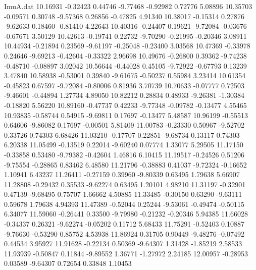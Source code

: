 \begin{filecontents}{ImuA.dat}
  10.16931   -0.32423    0.44746   -9.77468   -0.92982    0.72776    5.08896
  10.35703   -0.09571    0.30748   -9.57368    0.26856   -0.47825    4.91340
  10.38017   -0.15314    0.27876   -9.62633    0.18460   -0.81410    4.22643
  10.40316   -0.24407    0.19621   -9.72084   -0.03676   -0.67671    3.50129
  10.42613   -0.19741    0.22732   -9.70290   -0.21995   -0.20346    3.08911
  10.44934   -0.21894    0.23569   -9.61197   -0.25048   -0.23400    3.03568
  10.47369   -0.33978    0.24646   -9.69213   -0.42604   -0.33322    2.96698
  10.49676   -0.26800    0.39362   -9.74238   -0.48710   -0.08897    3.02042
  10.56644   -0.44028    0.45105   -9.72922   -0.67793    0.13239    3.47840
  10.58938   -0.53001    0.39840   -9.61675   -0.50237    0.55984    3.23414
  10.61354   -0.45823    0.67597   -9.72084   -0.80006    0.81936    3.70739
  10.70633   -0.07777    0.72503   -9.46601   -0.44894    1.27734    4.89050
  10.82212    0.28834    0.48933   -9.26381   -1.30384   -0.18820    5.56220
  10.89160   -0.47737    0.42233   -9.77348   -0.09782   -0.13477    4.55465
  10.93835   -0.58744    0.54915   -9.69811    0.17697   -0.13477    5.48587
  10.96199   -0.55513    0.64606   -9.86082    0.17697   -0.00501    5.81409
  11.00783   -0.23330    0.50967   -9.52702    0.33726    0.74303    6.68426
  11.03210   -0.17707    0.22851   -9.68734    0.13117    0.74303    6.20338
  11.05499   -0.13519    0.22014   -9.60240    0.07774    1.33077    5.29505
  11.17150   -0.33858    0.53480   -9.79382   -0.42604    1.46816    6.10415
  11.19517   -0.24526    0.51206   -9.75554   -0.28865    0.83462    6.48580
  11.21796   -0.38883    0.41037   -9.72324   -0.16652    1.10941    6.43237
  11.26411   -0.27159    0.39960   -9.80339    0.63495    1.79638    5.66907
  11.28808   -0.29432    0.35533   -9.62274    0.63495    1.20101    4.98210
  11.31197   -0.32901    0.47139   -9.68495    0.75707    1.66662    4.50885
  11.33485   -0.30150    0.63290   -9.63111    0.59678    1.79638    4.94393
  11.47389   -0.52044    0.25244   -9.53061   -0.49474   -0.50115    6.34077
  11.59060   -0.26441    0.33500   -9.79980   -0.21232   -0.20346    5.94385
  11.66028   -0.34337    0.26321   -9.62274   -0.05202    0.11712    5.68433
  11.75291   -0.52403    0.10887   -9.76630   -0.53290    0.85752    4.53938
  11.86924    0.31705    0.90449   -9.48276   -0.07492    0.44534    3.95927
  11.91628   -0.22134    0.50369   -9.64307    1.31428   -1.85219    2.58533
  11.93939   -0.50847    0.11844   -9.89552    1.36771   -1.27972    2.24185
  12.00957   -0.28953    0.03589   -9.64307    0.72654    0.33848    1.10453

\end{filecontents}
